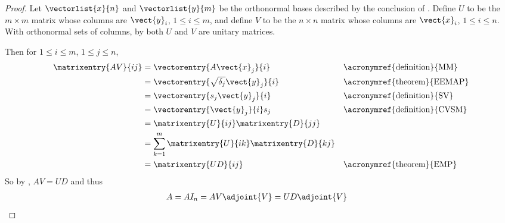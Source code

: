 %
\begin{proof}
Let $\vectorlist{x}{n}$ and $\vectorlist{y}{m}$ be the orthonormal bases described by the conclusion of .  Define $U$ to be the $m\times m$ matrix whose columns are $\vect{y}_i$, $1\leq i\leq m$, and define $V$ to be the $n\times n$ matrix whose columns are $\vect{x}_i$, $1\leq i\leq n$.  With orthonormal sets of columns, by  both $U$ and $V$ are unitary matrices.\par
%
Then for $1\leq i\leq m$, $1\leq j\leq n$,
%
\begin{align*}
\matrixentry{AV}{ij}
&=\vectorentry{A\vect{x}_j}{i}&&\text{\acronymref{definition}{MM}}\\
&=\vectorentry{\sqrt{\delta_j}\vect{y}_j}{i}&&\text{\acronymref{theorem}{EEMAP}}\\
&=\vectorentry{s_j\vect{y}_j}{i}&&\text{\acronymref{definition}{SV}}\\
&=\vectorentry{\vect{y}_j}{i}s_j&&\text{\acronymref{definition}{CVSM}}\\
&=\matrixentry{U}{ij}\matrixentry{D}{jj}\\
&=\sum_{k=1}^{m}\matrixentry{U}{ik}\matrixentry{D}{kj}\\
&=\matrixentry{UD}{ij}&&\text{\acronymref{theorem}{EMP}}
\end{align*}
%
So by , $AV=UD$ and thus
%
\begin{align*}
A&=AI_n=AV\adjoint{V}=UD\adjoint{V}
\end{align*}
%
\end{proof}
%
